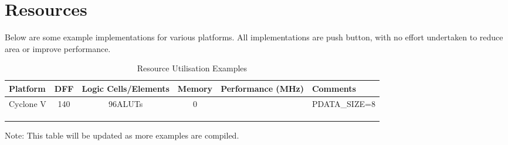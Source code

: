 \chapter{Resources}

Below are some example implementations for various platforms. All implementations are push button, with no effort undertaken to reduce area or improve performance. 
\setlength\LTleft{0pt}
\setlength\LTright{0pt}

\begin{longtable}[]{@{\extracolsep{\fill}}lcccc@{}}
	\toprule
		\textbf{Platform} & \textbf{DFF} & \textbf{Logic Cells/Elements} &
		\textbf{Memory} & \textbf{Performance (MHz)} & \textbf{Comments} &\tabularnewline
	\midrule
	\endhead
	 Cyclone V & 140  & 96ALUTs & 0 & & PDATA_SIZE=8\tabularnewline
		& & & & &\tabularnewline
		& & & & &\tabularnewline
	\bottomrule
	\caption{Resource Utilisation Examples}
	\label{tab:RESOURCES}
\end{longtable}

Note: This table will be updated as more examples are compiled.
